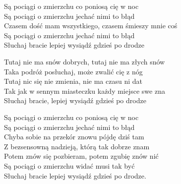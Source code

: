 \begin{text}
    Są pociągi o zmierzchu co poniosą cię w noc\\
    Są pociągi o zmierzchu jechać nimi to błąd\\
    Czasem dość mam wszystkiego, czasem śmieszy mnie coś\\
    Są pociągi o zmierzchu jechać nimi to błąd\\
    Słuchaj bracie lepiej wysiądź gdzieś po drodze

    Tutaj nie ma snów dobrych, tutaj nie ma złych snów\\
    Taka podróż posłuchaj, może zwalić cię z nóg\\
    Tutaj nic się nie zmienia, nie ma czasu ni dat\\
    Tak jak w sennym miasteczku każdy miejsce swe zna\\
    Słuchaj bracie, lepiej wysiądź gdzieś po drodze

    Są pociągi o zmierzchu co poniosą cię w noc\\
    Są pociągi o zmierzchu jechać nimi to błąd\\
    Chyba sobie na przekór znowu pójdę dziś tam\\
    Z bezsensowną nadzieją, którą tak dobrze znam\\
    Potem znów się pozbieram, potem zgubię znów nić\\
    Są pociągi o zmierzchu widać musi tak być\\
    Słuchaj bracie lepiej wysiądź gdzieś po drodze.
\end{text}
\begin{chord}

\end{chord}